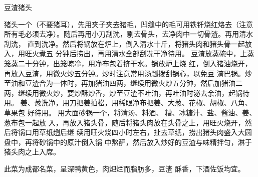 \begin{recipe}{豆渣猪头}

\ingredients


\preparation

\step 猪头一个（不要猪耳），先用夹子夹去猪毛，凹缝中的毛可用铁钎烧红烙去（注意
所有毛必须去净）。随后再用小刀刮洗，剔去骨头，去净肉中一切骨渣。再用清水刮洗，
直到洗净。然后将锅放在炉上，倒入清水十斤，将猪头肉和猪头骨一起放入，用旺火煮五
分钟后捞出，再用清水全部刮冼干净待用。
\step 豆渣放蒸碗中，上蒸笼蒸二十分钟，出笼晾冷，用净布包着挤干水。锅放炉上烧
红，倒入猪油烧开，再放入豆渣，用微火炒五分钟。炒时注意常用汤瓢拨刮锅心，以免豆
渣巴锅。炒至油和豆渣合为一体时，再加猪油四两，继续用微火炒五分钟，然后加猪油二
两，继续用微火炒，要炒酥炒香，炒至豆渣不吐油，再吐油时泌去余油，起锅待用。
\step 姜、葱洗净，用刀把姜拍松，用稀眼净布把姜、大葱、花椒、胡椒、八角、草果包
好待用。
\step 用大面砂锅一个，将清汤、料酒、𰪿糟、冰糖汁、盐、酱油、姜、葱布包一起放
入，再放入猪头骨，随后将猪头肉放在头骨之上，用旺火烧开，然后将锅口用草纸趔后继
续用旺火烧四小时左右，扯去草纸，捞出猪头肉盛入大圆盘中，再将砂锅中的原汁倒入锅
中熬酽，然后放入炒好的豆渣与味精拌匀，淋于猪头肉之上入席。

\features

此菜为成都名菜，呈深鸭黄色，肉𤆵烂而脂肪多，豆渣 酥香，下酒佐饭均宜。

\end{recipe}

